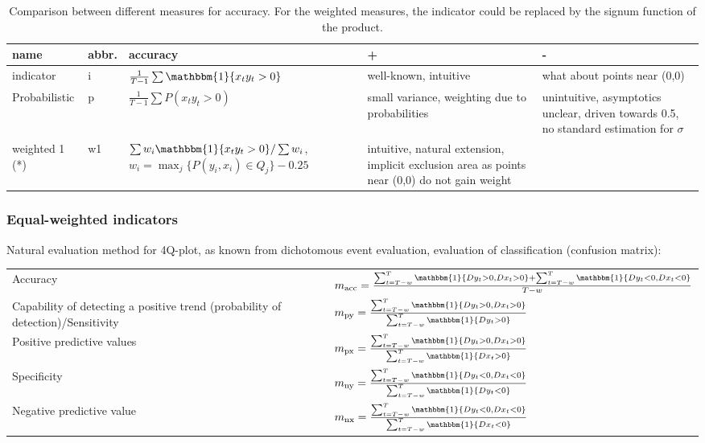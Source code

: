 \documentclass[oneside]{article}
\theoremstyle{plain}%
\theoremstyle{definition}
\newcommand{\ind}[1]{\mathbbm{1}\{#1\}}
\newcommand{\ydiff}{D y}
\newcommand{\xdiff}{Dx}
\begin{document}
\begin{table}[]
    \centering
    \begin{tabular}{l l p{4cm} p{4cm} p{4cm}}
    \toprule
    name & abbr. & accuracy & + & - \\ \midrule
    indicator & i & $\frac{1}{T-1} \sum \ind{x_t y_t > 0}$ &  well-known, intuitive & what about points near (0,0) \\
    Probabilistic & p & $\frac{1}{T-1} \sum P{(x_t y_t > 0)}$ & small variance, weighting due to probabilities & unintuitive, asymptotics unclear, driven towards 0.5, no standard estimation for $\sigma$  \\
    weighted 1 (*) & w1 & {\small {$\sum w_i \ind{x_t y_t > 0} / \sum w_i$,\newline $w_i = \max_j\{P(y_i, x_i) \in Q_j \} - 0.25$}} & intuitive, natural extension, implicit exclusion area as points near (0,0) do not gain weight & \\ \bottomrule
    \end{tabular}
    \caption{Comparison between different measures for accuracy. For the weighted measures, the indicator could be replaced by the signum function of the product.}
    \label{tab:comparison-measures}
\end{table}

\subsubsection{Equal-weighted indicators} \label{sec:equal-weight}

Natural evaluation method for 4Q-plot, as known from dichotomous event evaluation, evaluation of classification (confusion matrix):

\begin{tabularx}{\textwidth}{p{5cm} X}
     Accuracy & $m_{\text{acc}} = \frac{\sum_{t=T-w}^T \ind{\ydiff_t > 0, \xdiff_t > 0} + \sum_{t=T-w}^T \ind{\ydiff_t < 0, \xdiff_t < 0}}{T-w}$ \\
     Capability of detecting a positive trend (probability of detection)/Sensitivity & $m_{\text{py}} = \frac{\sum_{t=T-w}^T \ind{\ydiff_t > 0, \xdiff_t > 0}}{\sum_{t=T-w}^T \ind{\ydiff_t > 0}}$ \\
     Positive predictive values & $ m_{\text{px}} = \frac{\sum_{t=T-w}^T \ind{\ydiff_t > 0, \xdiff_t > 0}}{\sum_{t=T-w}^T \ind{\xdiff_t > 0}}$ \\
     Specificity & $m_{\text{ny}} =  \frac{\sum_{t=T-w}^T \ind{\ydiff_t < 0, \xdiff_t < 0}}{\sum_{t=T-w}^T \ind{\ydiff_t < 0}} $ \\
     Negative predictive value & $m_{\text{nx}} =  \frac{\sum_{t=T-w}^T \ind{\ydiff_t < 0, \xdiff_t < 0}}{\sum_{t=T-w}^T \ind{\xdiff_t < 0}}$
\end{tabularx}
\end{document}
